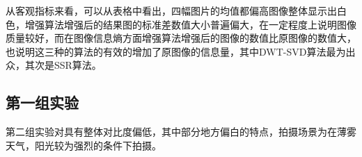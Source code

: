 \documentclass[12pt]{book}
\begin{document}
从客观指标来看，可以从表格中看出，四幅图片的均值都偏高图像整体显示出白色，增强算法增强后的结果图的标准差数值大小普遍偏大，在一定程度上说明图像质量较好，而在图像信息熵方面增强算法增强后的图像的数值比原图像的数值大，也说明这三种的算法的有效的增加了原图像的信息量，其中DWT-SVD算法最为出众，其次是SSR算法。
			\subsection{第一组实验}第二组实验对具有整体对比度偏低，其中部分地方偏白的特点，拍摄场景为在薄雾天气，阳光较为强烈的条件下拍摄。
\end{document}
